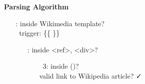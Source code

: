 \documentclass[11pt,a4paper]{article}
\title{}
\date{}
\newcommand{\bt}[1]{\textbf{#1}} %
\newcommand{\nblue}[1]{\textcolor{niceblue}{#1}} %
\newcommand{\green}[1]{\textcolor{javagreen}{#1}} %
\newcommand{\gray}[1]{\textcolor[gray]{0.65}{#1}} %
\newcommand{\red}[1]{{\leavevmode\color{sred}{#1}}} %
\newcommand{\yellow}[1]{{\leavevmode\color{yellow}{#1}}} %
\begin{document}
{\large \nblue{\bt{Parsing Algorithm}}}
\begin{itemize}
    \item[\red{\faFlag\ 1}:] inside Wikimedia template?\\
        \ \gray{trigger: \{\{ \}\}}
    \begin{itemize}
        \item[\yellow{\faFlag\ 2}:] inside <ref>, <div>?
        \begin{itemize}
            \item[\faFlag\  3:] inside ()?\\
        \green{\faSignin} valid link to Wikipedia article? \faCheck
        \end{itemize}
    \end{itemize}
\end{itemize}
\end{document}
